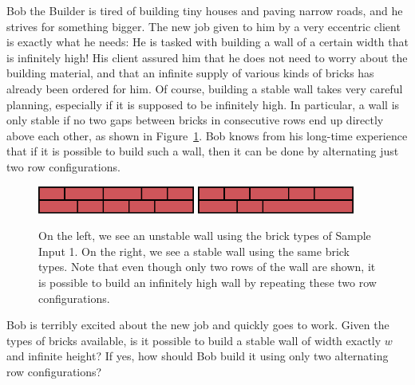 Bob the Builder is tired of building tiny houses and paving narrow roads, and he strives for something bigger.
The new job given to him by a very eccentric client is exactly what he needs:
He is tasked with building a wall of a certain width that is infinitely high!
His client assured him that he does not need to worry about the building material, and that an infinite supply of various kinds of bricks has already been ordered for him.
Of course, building a stable wall takes very careful planning, especially if it is supposed to be infinitely high. 
In particular, a wall is only stable if no two gaps between bricks in consecutive rows end up directly above each other, as shown in Figure~\ref{fig:bricks}.
Bob knows from his long-time experience that if it is possible to build such a wall, then it can be done by alternating just two row configurations.


\begin{figure}[h]
  \includegraphics[width=0.46\textwidth]{sample_wa}
  \hfill
  \includegraphics[width=0.46\textwidth]{sample}
  \caption{On the left, we see an unstable wall using the brick types of Sample Input 1.
    On the right, we see a stable wall using the same brick types.
    Note that even though only two rows of the wall are shown, it is possible to build an infinitely high wall by repeating these two row configurations.}
    \label{fig:bricks}
\end{figure}

Bob is terribly excited about the new job and quickly goes to work.
Given the types of bricks available, is it possible to build a stable wall of
width exactly $w$ and infinite height?
If yes, how should Bob build it using only two alternating row configurations?

